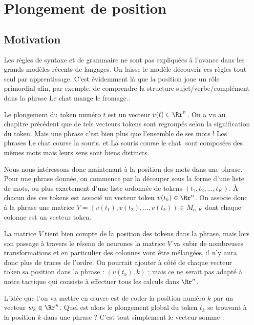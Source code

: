 \documentclass[11pt,class=report,crop=false]{standalone}
\begin{document}
\section{Plongement de position}

\subsection{Motivation}

Les règles de syntaxe et de grammaire ne sont pas expliquées à l'avance dans les grands modèles récents de langages.
On laisse le modèle découvrir ces règles tout seul par apprentissage. C'est évidemment là que la position joue un rôle primordial afin, par exemple, de comprendre la structure sujet/verbe/complément dans la phrase \og{}Le chat mange le fromage.\fg{}.

Le plongement du token numéro $t$ est un vecteur $v(t) \in \Rr^n$.
On a vu au chapitre précédent que de tels vecteurs tokens sont regroupés selon la signification du token.
Mais une phrase c'est bien plus que l'ensemble de ses mots ! Les phrases \og{}Le chat course la souris.\fg{} et \og{}La souris course le chat.\fg{} sont composées des mêmes mots mais leurs sens sont biens distincts.


Nous nous intéressons donc maintenant à la position des mots dans une phrase.
Pour une phrase donnée, on commence par la découper sous la forme d'une liste de mots, ou plus exactement d'une liste ordonnée de tokens $(t_1,t_2,\ldots,t_K)$.
À chacun des ces tokens est associé un vecteur token $v(t_k) \in \Rr^n$. On associe donc à la phrase une matrice $V = ( v(t_1), v(t_2), \ldots, v(t_k) ) \in M_{n,K}$ dont chaque colonne est un vecteur token.



La matrice $V$ tient bien compte de la position des tokens dans la phrase, mais lors son passage à travers le réseau de neurones la matrice $V$ va subir de nombreuses transformations et en particulier des colonnes vont être mélangées, il n'y aura donc plus de traces de l'ordre.
On pourrait ajouter à côté de chaque vecteur token sa position dans la phrase : $(v(t_k), k)$ ; mais ce ne serait pas adapté à notre tactique qui consiste à effectuer tous les calculs dans $\Rr^n$.

L'idée que l'on va mettre en œuvre est de coder la position numéro $k$ par un vecteur $w_k \in \Rr^n$.
Quel est alors le plongement global du token $t_k$ se trouvant à la position $k$ dans une phrase ?
C'est tout simplement le vecteur somme :
\end{document}
